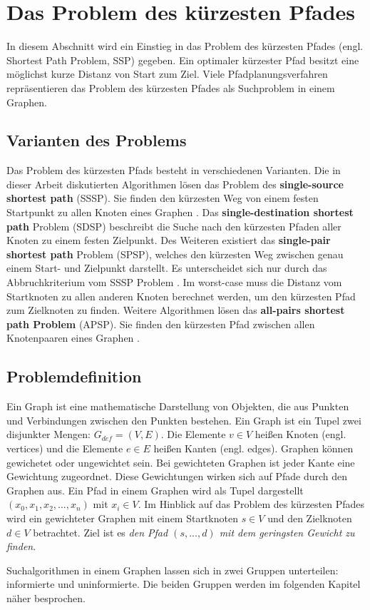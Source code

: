 \chapter{Das Problem des kürzesten Pfades}

In diesem Abschnitt wird ein Einstieg in das Problem des kürzesten Pfades (engl. Shortest Path Problem, SSP) gegeben. Ein optimaler kürzester Pfad besitzt eine möglichst kurze Distanz von Start zum Ziel\cite{Madkour.2017}. Viele Pfadplanungsverfahren repräsentieren das Problem des kürzesten Pfades als Suchproblem in einem Graphen.


\section{Varianten des Problems}

Das Problem des kürzesten Pfads besteht in verschiedenen Varianten. Die in dieser Arbeit diskutierten Algorithmen lösen das Problem des \textbf{single-source shortest path} (SSSP). Sie finden den kürzesten Weg von einem festen Startpunkt zu allen Knoten eines Graphen \cite{Gu.2018}. Das \textbf{single-destination shortest path} Problem (SDSP)  beschreibt die Suche nach den kürzesten Pfaden aller Knoten zu einem festen Zielpunkt. Des Weiteren existiert das \textbf{single-pair shortest path} Problem (SPSP), welches den kürzesten Weg zwischen genau einem Start- und Zielpunkt darstellt. Es unterscheidet sich nur durch das Abbruchkriterium vom SSSP Problem \cite{Ottmann.2017}. Im worst-case muss die Distanz vom Startknoten zu allen anderen Knoten berechnet werden, um den kürzesten Pfad zum Zielknoten zu finden. Weitere Algorithmen lösen das \textbf{all-pairs shortest path Problem} (APSP). Sie finden den kürzesten Pfad zwischen allen Knotenpaaren eines Graphen \cite{Cormen.2009}.


\section{Problemdefinition}

Ein Graph ist eine mathematische Darstellung von Objekten, die aus Punkten und Verbindungen zwischen den Punkten bestehen. Ein Graph ist ein Tupel zwei disjunkter Mengen: $G_{def}= (V,E)$. Die Elemente $v \in V$ heißen Knoten (engl. vertices) und die Elemente $e \in E$ heißen Kanten (engl. edges). Graphen können gewichetet oder ungewichtet sein. Bei gewichteten Graphen ist jeder Kante eine Gewichtung zugeordnet. Diese Gewichtungen wirken sich auf Pfade durch den Graphen aus\cite{Gross.2004}. Ein Pfad in einem Graphen wird als Tupel dargestellt $\left ( x_{0}, x_{1}, x_{2}, ..., x_{n} \right )$ mit $x_{i} \in V$.  Im Hinblick auf das Problem des kürzesten Pfades wird ein gewichteter Graphen mit einem Startknoten $s \in V$ und den Zielknoten $d \in V$ betrachtet. Ziel ist es \textit{den Pfad  $\left ( s, ..., d \right )$ mit dem geringsten Gewicht zu finden}\cite{Madkour.2017}. 



Suchalgorithmen in einem Graphen lassen sich in zwei Gruppen unterteilen:
informierte und uninformierte. Die beiden Gruppen werden im folgenden Kapitel
näher besprochen.